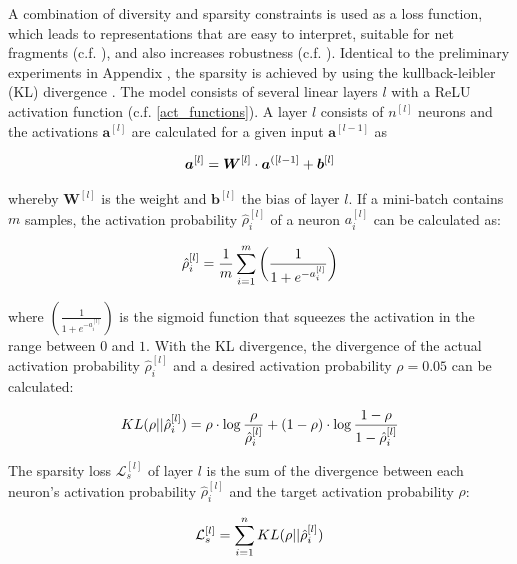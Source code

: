 A combination of diversity and sparsity constraints is used as a loss function, which leads to representations that are easy to interpret, suitable for net fragments (c.f. ), and also increases robustness (c.f. ).
Identical to the preliminary experiments in Appendix , the sparsity is achieved by using the kullback-leibler (KL) divergence .
The model consists of several linear layers $l$ with a ReLU activation function (c.f. \eqref{act_functions}).
A layer $l$ consists of $n^{[l]}$ neurons and the activations $\boldsymbol{a}^{[l]}$ are calculated for a given input $\boldsymbol{a}^{[l-1]}$ as

\begin{align}\eqlbl{vso_1}
		\boldsymbol{a}^{[l]} = \boldsymbol{W}^{[l]} \cdot \boldsymbol{a}^{([l-1]} + \boldsymbol{b}^{[l]}
\end{align}

whereby $\boldsymbol{W}^{[l]}$ is the weight and $\boldsymbol{b}^{[l]}$ the bias of layer $l$.
If a mini-batch contains $m$ samples, the activation probability $\hat{\rho}^{[l]}_i$ of a neuron $a^{[l]}_i$ can be calculated as:

\begin{align}\eqlbl{vso_2}
		\hat{\rho}^{[l]}_i= \frac{1}{m} \sum^m_{i=1} \left( \frac{1}{1+e^{-a^{[l]}_i}} \right)
\end{align}

where $\left( \frac{1}{1+e^{-a^{[l]}_i}} \right)$ is the sigmoid function that squeezes the activation in the range between $0$ and $1$.
With the KL divergence, the divergence of the actual activation probability $\hat{\rho}^{[l]}_i$ and a desired activation probability $\rho=0.05$ can be calculated:

\begin{align}\eqlbl{vso_3}
		KL(\rho || \hat{\rho}^{[l]}_i) = \rho \cdot \log \frac{\rho}{\hat{\rho}^{[l]}_i} + (1-\rho) \cdot \log \frac{1-\rho}{1-\hat{\rho}^{[l]}_i}
\end{align}

The sparsity loss $\mathcal{L}^{[l]}_{s}$ of layer $l$ is the sum of the divergence between each neuron's activation probability $\hat{\rho}^{[l]}_i$ and the target activation probability $\rho$:

\begin{align}\eqlbl{vso_4}
		\mathcal{L}^{[l]}_{s} = \sum_{i=1}^{n} KL(\rho || \hat{\rho}^{[l]}_i)
\end{align}

